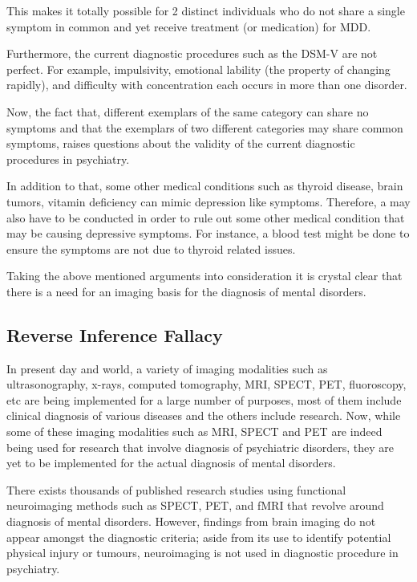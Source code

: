 \documentclass{article}
\begin{document}
This makes it totally possible for 2 distinct individuals who do not
share a single symptom in common and yet receive treatment (or
medication) for MDD.

Furthermore, the current diagnostic procedures such as the DSM-V are
not perfect. For example, impulsivity, emotional lability (the
property of changing rapidly), and difficulty with concentration each
occurs in more than one disorder.

Now, the fact that, different exemplars of the same category can share
no symptoms and that the exemplars of two different categories may
share common symptoms, raises questions about the validity of the
current diagnostic procedures in psychiatry.

In addition to that, some other medical conditions such as thyroid
disease, brain tumors, vitamin deficiency can mimic depression like
symptoms. Therefore, a may also have to be conducted in order to rule
out some other medical condition that may be causing depressive
symptoms. For instance, a blood test might be done to ensure the
symptoms are not due to thyroid related issues.

Taking the above mentioned arguments into consideration it is crystal
clear that there is a need for an imaging basis for the diagnosis of
mental disorders.

\subsection{Reverse Inference Fallacy}

In present day and world, a variety of imaging modalities such as
ultrasonography, x-rays, computed tomography, MRI, SPECT, PET,
fluoroscopy, etc are being implemented for a large number of purposes,
most of them include clinical diagnosis of various diseases and the
others include research. Now, while some of these imaging modalities
such as MRI, SPECT and PET are indeed being used for research that
involve diagnosis of psychiatric disorders, they are yet to be
implemented for the actual diagnosis of mental disorders.

There exists thousands of published research studies using functional
neuroimaging methods such as SPECT, PET, and fMRI that revolve around
diagnosis of mental disorders. However, findings from brain imaging do
not appear amongst the diagnostic criteria; aside from its use to
identify potential physical injury or tumours, neuroimaging is not
used in diagnostic procedure in psychiatry.
\end{document}
